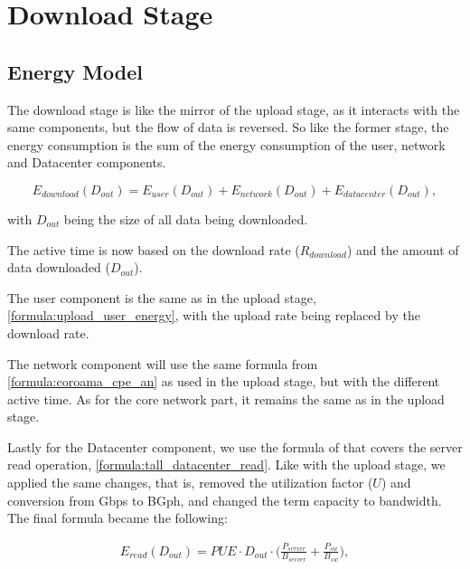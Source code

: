 \section{Download Stage}

\subsection{Energy Model}

    The download stage is like the mirror of the upload stage, as it interacts with the same components, but the flow of data is reversed. So like the former stage, the energy consumption is the sum of the energy consumption of the user, network and Datacenter components.

    \begin{equation}
        \label{formula:download_stage}
        E_{download}(D_{out}) = E_{user}(D_{out}) + E_{network}(D_{out}) + E_{datacenter}(D_{out}),
    \end{equation}

    \noindent with $D_{out}$ being the size of all data being downloaded.

    The active time is now based on the download rate ($R_{download}$) and the amount of data downloaded ($D_{out}$).

    The user component is the same as in the upload stage, \ref{formula:upload_user_energy}, with the upload rate being replaced by the download rate.

    The network component will use the same formula from \ref{formula:coroama_cpe_an} as used in the upload stage, but with the different active time.
    As for the core network part, it remains the same as in the upload stage.

    Lastly for the Datacenter component, we use the formula of \citet{Taal2014} that covers the server read operation, \ref{formula:tall_datacenter_read}. Like with the upload stage, we applied the same changes, that is, removed the utilization factor ($U$) and conversion from Gbps to BGph, and changed the term capacity to bandwidth. The final formula became the following: 

    \begin{equation}
    \label{formula:download_server_read}
    \begin{split}
        E_{read}(D_{out}) = PUE \cdot D_{out} \cdot \Bigg( \frac{P_{server}}{B_{server}} + \frac{P_{sw}}{B_{sw}}\Bigg),
    \end{split}
    \end{equation}


